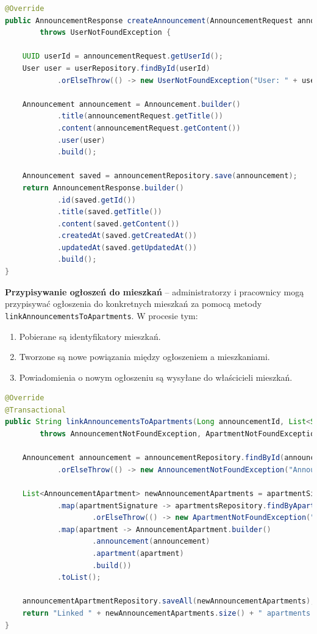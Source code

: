 \begin{lstlisting}[language=Java, caption=Dodawanie ogłoszenia.]
@Override
public AnnouncementResponse createAnnouncement(AnnouncementRequest announcementRequest) 
        throws UserNotFoundException {

    UUID userId = announcementRequest.getUserId();
    User user = userRepository.findById(userId)
            .orElseThrow(() -> new UserNotFoundException("User: " + userId + " not found"));

    Announcement announcement = Announcement.builder()
            .title(announcementRequest.getTitle())
            .content(announcementRequest.getContent())
            .user(user)
            .build();

    Announcement saved = announcementRepository.save(announcement);
    return AnnouncementResponse.builder()
            .id(saved.getId())
            .title(saved.getTitle())
            .content(saved.getContent())
            .createdAt(saved.getCreatedAt())
            .updatedAt(saved.getUpdatedAt())
            .build();
}
\end{lstlisting}

\textbf{Przypisywanie ogłoszeń do mieszkań} -- administratorzy i pracownicy mogą przypisywać ogłoszenia do konkretnych mieszkań za pomocą metody \texttt{linkAnnouncementsToApartments}. W procesie tym:
\begin{enumerate}
    \item Pobierane są identyfikatory mieszkań.
    \item Tworzone są nowe powiązania między ogłoszeniem a mieszkaniami.
    \item Powiadomienia o nowym ogłoszeniu są wysyłane do właścicieli mieszkań.
\end{enumerate}

\begin{lstlisting}[language=Java, caption=Przypisywanie ogłoszeń do mieszkań.]
@Override
@Transactional
public String linkAnnouncementsToApartments(Long announcementId, List<String> apartmentSignatures) 
        throws AnnouncementNotFoundException, ApartmentNotFoundException {

    Announcement announcement = announcementRepository.findById(announcementId)
            .orElseThrow(() -> new AnnouncementNotFoundException("Announcement: " + announcementId + " not found"));

    List<AnnouncementApartment> newAnnouncementApartments = apartmentSignatures.stream()
            .map(apartmentSignature -> apartmentsRepository.findByApartmentSignature(apartmentSignature)
                    .orElseThrow(() -> new ApartmentNotFoundException("Apartment: " + apartmentSignature + " not found")))
            .map(apartment -> AnnouncementApartment.builder()
                    .announcement(announcement)
                    .apartment(apartment)
                    .build())
            .toList();

    announcementApartmentRepository.saveAll(newAnnouncementApartments);
    return "Linked " + newAnnouncementApartments.size() + " apartments to announcement: " + announcementId;
}
\end{lstlisting}

